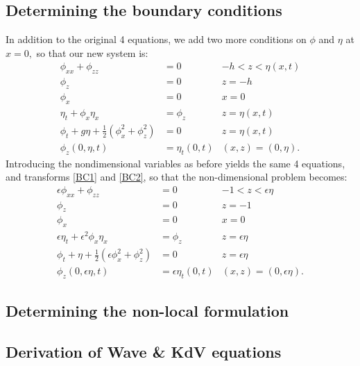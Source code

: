 \documentclass[10pt,reqno,oneside,a4paper]{article}
\begin{document}
\subsection{Determining the boundary conditions}
In addition to the original 4 equations, we add two more conditions on $\phi$ and $\eta$ at $x=0,$ so that our new system is:
\begin{subequations} \label{DimHalfLineProblem}
\begin{align}
\phi_{xx} + \phi_{zz} &= 0 &-h < z < \eta(x,t) \\
\phi_{z} &= 0 &z = -h \\
\label{BC1}\phi_{x} &= 0 &x =0 \\
\eta_t + \phi_{x}\eta_{x} &= \phi_{z} & z = \eta(x,t) \\
\phi_t + g\eta + \frac{1}{2}(\phi_{x}^2 + \phi_{z}^2) &= 0 &z = \eta(x,t) \\
\label{BC2}\phi_{z}(0,\eta,t) &= \eta_t(0,t) &(x,z) = (0,\eta). 
\end{align}
\end{subequations}
Introducing the nondimensional variables as before yields the same 4 equations, and transforms \eqref{BC1} and \eqref{BC2}, so that the non-dimensional problem becomes:
\begin{subequations} \label{NondimHalfLineProblem}
\begin{align}
\label{NondimPDE}\epsilon\phi_{xx} + \phi_{zz} &= 0 &-1 < z < \epsilon\eta \\
\label{NondimBC1}\phi_{z} &= 0 &z = -1 \\
\label{NondimBC2}\phi_{x} &= 0 &x =0 \\
\label{NondimBC3}\epsilon\eta_t + \epsilon^2 \phi_{x}\eta_{x} &= \phi_{z} & z = \epsilon\eta\\
\label{NondimBC4}\phi_t + \eta + \frac{1}{2}(\epsilon\phi_{x}^2 + \phi_{z}^2) &= 0 &z = \epsilon\eta \\
\label{NondimBC5}\phi_{z}(0,\epsilon\eta,t) &= \epsilon\eta_t(0,t) &(x,z) = (0,\epsilon\eta).
\end{align}
\end{subequations}

\subsection{Determining the non-local formulation}

\subsection{Derivation of Wave \& KdV equations}
\end{document}
